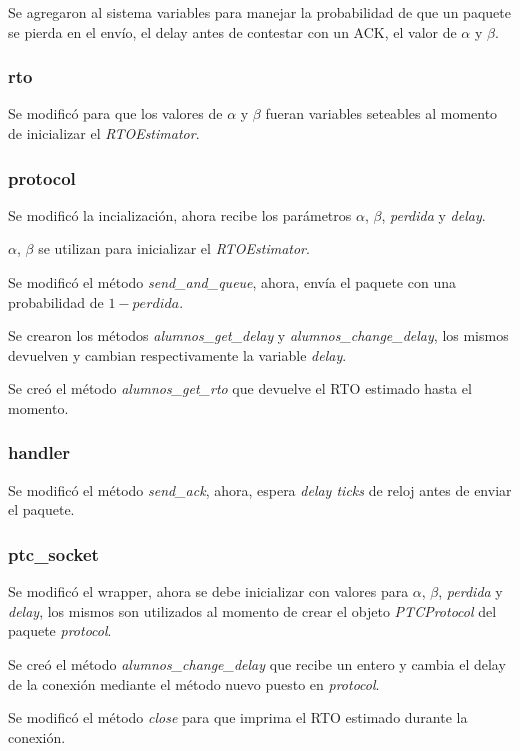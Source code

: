     Se agregaron al sistema variables para manejar la probabilidad de que 
    un paquete se pierda en el env\'io, el delay antes de contestar con 
    un ACK, el valor de $\alpha$ y $\beta$.

\subsubsection{rto}
    Se modific\'o para que los valores de $\alpha$ y $\beta$ fueran 
    variables seteables al momento de inicializar el \textit{RTOEstimator}.
    
\subsubsection{protocol}
    Se modific\'o la incializaci\'on, ahora recibe los par\'ametros 
    $\alpha$, $\beta$, \textit{perdida} y \textit{delay}.
    
    $\alpha$, $\beta$ se utilizan para inicializar el \textit{RTOEstimator}.
    
    Se modific\'o el m\'etodo \textit{send_and_queue}, ahora, env\'ia 
    el paquete con una probabilidad de $1-perdida$.
    
    Se crearon los m\'etodos \textit{alumnos_get_delay} y 
    \textit{alumnos_change_delay}, los mismos devuelven y cambian
    respectivamente la variable \textit{delay}.
    
    Se cre\'o el m\'etodo \textit{alumnos_get_rto} que devuelve el RTO
    estimado hasta el momento.
        
\subsubsection{handler}
    Se modific\'o el m\'etodo \textit{send_ack}, ahora, espera 
    \textit{delay ticks} de reloj antes de enviar el paquete.
    
\subsubsection{ptc_socket}
    Se modific\'o el wrapper, ahora se debe inicializar con valores para 
    $\alpha$, $\beta$, \textit{perdida} y \textit{delay}, los mismos son
    utilizados al momento de crear el objeto \textit{PTCProtocol} del 
    paquete \textit{protocol}.
    
    Se cre\'o el m\'etodo \textit{alumnos_change_delay} que recibe un
    entero y cambia el delay de la conexi\'on mediante el m\'etodo nuevo
    puesto en \textit{protocol}.
    
    Se modific\'o el m\'etodo \textit{close} para que imprima el RTO 
    estimado durante la conexi\'on.
